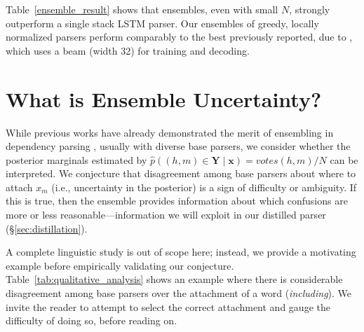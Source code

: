 \documentclass[11pt,letterpaper]{article}
\newcommand{\ignore}[1]{}
\newcommand{\lingpengcomment}[1]{\ignore{\textcolor{green}{{\textbf{[#1 --\textsc{lpk}]}}}}}
\newcommand{\cjd}[1]{\textcolor{cyan}{\ignore{{\textbf{[#1 --\textsc{cjd}]}}}}}
\newcommand{\nascomment}[1]{\ignore{\textcolor{blue}{{\textbf{[#1 --\textsc{nas}]}}}}}
\begin{document}
Table~\ref{ensemble_result} shows that ensembles, even with small $N$,  strongly outperform a single stack LSTM parser.\ignore{This even holds with relaxed parsing, which preserves the $O(n)$ runtime guarantee and does not suffer on UAS or LAS.\cjd{this is not correct, see above}\lingpengcomment{it feels kind of meaningless to talk about UAS in relatxed parsing... UAS is indeed measurable in relaxed parsing, but since it give up the well-formal tree constraint, does not suffer on UAS doesn't seem to be a real advantage? personally view though... Is it really necessary to talk about relax parsing?}}  Our ensembles of greedy, locally normalized parsers perform comparably to the best previously reported, due to , which uses a beam (width 32) \nascomment{please check} for training and decoding. 

\ignore{\nascomment{earlier we said that we ``peak out'' at 20, but that is not shown by the results.}}







\ignore{\nascomment{need to explicitly compare to SOTA if we are going to claim it.  I have done so.}}
\section{What is Ensemble Uncertainty?}\label{sec:ensemble_ambiguity}

While previous works have already demonstrated the merit of ensembling in dependency parsing \cite{ensemble_reparsing,ensemble_cheap_and_good}, usually with diverse base parsers, we consider whether the posterior
marginals estimated by $\hat{p}((h, m) \in \boldsymbol{Y} \mid \boldsymbol{x}) = \mathit{votes}(h, m)/N$ can be interpreted.  
We conjecture that disagreement among base parsers about where to attach $x_m$ (i.e., uncertainty in the posterior) is a sign of difficulty or ambiguity.  If this is true, then the ensemble provides information about which confusions are more or less reasonable---information we will exploit in our distilled  parser (\S\ref{sec:distillation}).

A complete linguistic study is out of scope here; instead, we provide a motivating example before empirically validating our conjecture.
Table~\ref{tab:qualitative_analysis} shows an example where there is considerable disagreement among base parsers over the attachment of a word (\emph{including}). We invite the reader to attempt to select the correct attachment and gauge the difficulty of doing so, before reading on.
\end{document}

